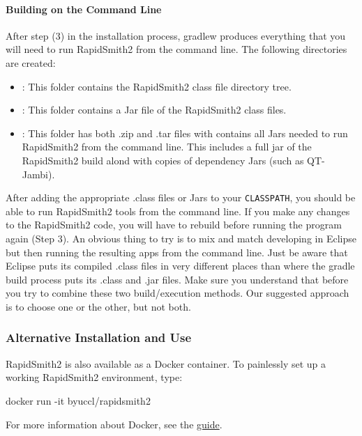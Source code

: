 \begin{enumerate}
  \paragraph{Building on the Command Line} After step (3) in the installation
  process, gradlew produces everything that you will need to run RapidSmith2 from the
  command line. The following directories are created: 
  \begin{itemize}
    \item {}: This folder contains the RapidSmith2 class file
    directory tree.
    \item {}: This folder contains a Jar file of the RapidSmith2 class
    files.
    \item {}: This folder has both .zip and .tar files
    with contains all Jars needed to run RapidSmith2 from the command line. This
    includes a full jar of the RapidSmith2 build alond with copies of dependency Jars
    (such as QT-Jambi).
  \end{itemize} 
  After adding the appropriate .class files or Jars to your \texttt{CLASSPATH},
  you should be able to run RapidSmith2 tools from the command line. If you make any
  changes to the RapidSmith2 code, you will have to rebuild before running the program
  again (Step 3).  An obvious thing to try is to mix and match
  developing in Eclipse but then running the resulting apps from the command
  line. Just be aware that Eclipse puts its compiled .class files in very
  different places than where the gradle build process puts its .class and
  .jar files. Make sure you understand that before you try to combine these two
  build/execution methods. Our suggested approach is to choose one or the
  other, but not both.
\end{enumerate}

\subsubsection{Alternative Installation and Use}

RapidSmith2 is also available as a Docker container. To painlessly set up a working RapidSmith2 environment, type:
\vspace{-0.05in}
\begin{code}
docker run -it byuccl/rapidsmith2
\end{code}
\vspace{0.04in}
For more information about Docker, see the \href{https://docs.docker.com/engine/getstarted/}{\color{blue}guide}.

